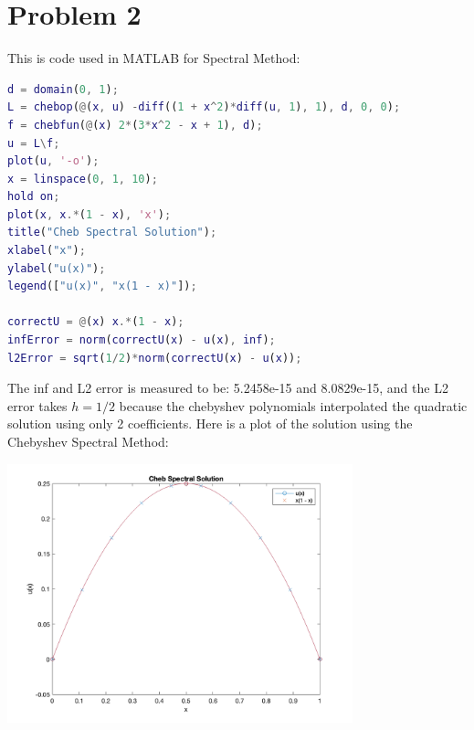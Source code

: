 \documentclass[]{article}
\begin{document}
\section*{Problem 2}
    This is code used in MATLAB for Spectral Method: 
    \begin{lstlisting}[language=matlab]
d = domain(0, 1); 
L = chebop(@(x, u) -diff((1 + x^2)*diff(u, 1), 1), d, 0, 0); 
f = chebfun(@(x) 2*(3*x^2 - x + 1), d);
u = L\f;
plot(u, '-o');
x = linspace(0, 1, 10);
hold on;
plot(x, x.*(1 - x), 'x');
title("Cheb Spectral Solution");
xlabel("x");
ylabel("u(x)");
legend(["u(x)", "x(1 - x)"]);

correctU = @(x) x.*(1 - x);
infError = norm(correctU(x) - u(x), inf);
l2Error = sqrt(1/2)*norm(correctU(x) - u(x));
    \end{lstlisting}
    The inf and L2 error is measured to be: 5.2458e-15 and 8.0829e-15, and the L2 error takes $h = 1/2$ because the chebyshev polynomials interpolated the quadratic solution using only 2 coefficients. Here is a plot of the solution using the Chebyshev Spectral Method: 
    \begin{center}
        \includegraphics[width=10cm]{chebyshev_spectral.png}
    \end{center}
\end{document}
